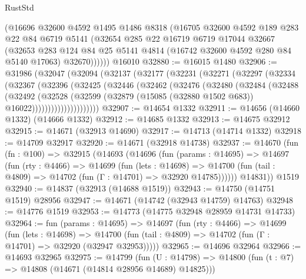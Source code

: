 \begin{lexlean}{RustStd}
\begin{coremodule}
        (@16696
          @32600
          @4592
          @1495
          @1486
          @8318
          (@16705
            @32600
            @4592
            @189
            @283
            @22
            @84
            @6719
            @5141
            (@32654
              @285
              @22
              @16719
              @6719
              @17044
              @32667
              (@32653
                @283
                @124
                @84
                @25
                @5141
                @4814
                (@16742 @32600 @4592 @280 @84 @5140 @17063)
                @32670))))))
    @16010
@32880 := @16015 @1480
@32906 := @31986
    (@32047
      (@32094
        (@32137
          (@32177
            (@32231
              (@32271
                (@32297
                  (@32334
                    (@32367
                      (@32396
                        (@32425
                          (@32446
                            (@32462
                              (@32476
                                (@32480
                                  (@32484
                                    (@32488
                                      (@32492
                                        (@32528
                                          (@32599
                                            (@32879
                                              (@15085 (@32880 @1502 @683))
                                              @16022)))))))))))))))))))))
@32907 := @14654 @1332
@32911 := @14656 (@14660 @1332) (@14666 @1332)
@32912 := @14685 @1332
@32913 := @14675 @32912
@32915 := @14671 (@32913 @14690)
@32917 := @14713 (@14714 @1332)
@32918 := @14709 @32917
@32920 := @14671 (@32918 @14738)
@32937 := @14670
    (fun (fn : @100) =>
    @32915
      (@14693
        (@14696
          (fun (params : @14695) =>
          @14697
            (fun (rty : @4466) =>
            @14699
              (fun (lets : @14698) =>
              @14700 (fun (tail : @4809) => @14702 (fun (Γ : @14701) => @32920 @14785))))))
        @14831))
    @1519
@32940 := @14837 (@32913 (@14688 @1519))
@32943 := @14750 (@14751 @1519) @28956
@32947 := @14671 (@14742 (@32943 @14759) @14763)
@32948 := @14776 @1519
@32953 := @14773 (@14775 @32948 @28959 @14731 @14733)
@32964 := fun (params : @14695) =>
  @14697
    (fun (rty : @4466) =>
    @14699
      (fun (lets : @14698) =>
      @14700 (fun (tail : @4809) => @14702 (fun (Γ : @14701) => @32920 (@32947 @32953)))))
@32965 := @14696 @32964
@32966 := @14693 @32965
@32975 := @14799
    (fun (U : @14798) => @14800 (fun (t : @7) => @14808 (@14671 (@14814 @28956 @14689) @14825)))

\end{coremodule}
\end{lexlean}
